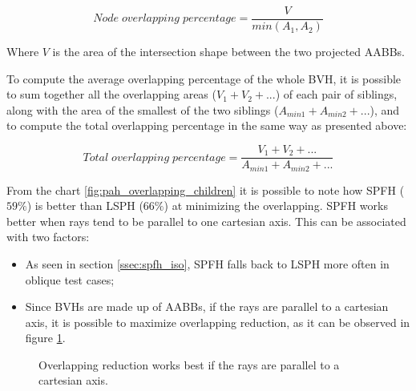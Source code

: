 \documentclass[acmtog, anonymous, review]{acmart}
\begin{document}
$$
Node \; overlapping \; percentage = \frac{V}{min(A_1, A_2)
}$$

Where $V$ is the area of the intersection shape between the two projected AABBs.

To compute the average overlapping percentage of the whole BVH, it is possible to sum together all the overlapping areas ($V_1 + V_2 + ...$) of each pair of siblings, along with the area of the smallest of the two siblings ($A_{min1} + A_{min2} + ...$), and to compute the total overlapping percentage in the same way as presented above:

$$
Total \; overlapping \; percentage = \frac{V_1 + V_2 + ...}{A_{min1} + A_{min2} + ...}
$$

From the chart \ref{fig:pah_overlapping_children} it is possible to note how SPFH ($59\%$) is better than LSPH ($66\%$) at minimizing the overlapping. SPFH works better when rays tend to be parallel to one cartesian axis. This can be associated with two factors: 
\begin{itemize}
	\item As seen in section \ref{ssec:spfh_iso}, SPFH falls back to LSPH more often in oblique test cases;
	\item Since BVHs are made up of AABBs, if the rays are parallel to a cartesian axis, it is possible to maximize overlapping reduction, as it can be observed in figure \ref{fig:overlapping_avoidance_parallel_vs_oblique}.
\end{itemize}

\begin{figure}
  \quad
  \caption{Overlapping reduction works best if the rays are parallel to a cartesian axis.}
  \label{fig:overlapping_avoidance_parallel_vs_oblique}
\end{figure}
\end{document}
